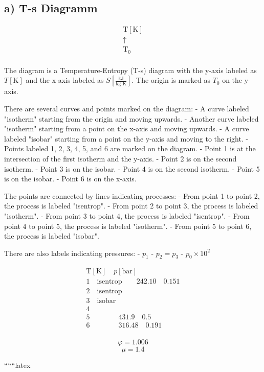 \subsection*{a) T-s Diagramm}

\[
\begin{array}{c}
\text{T} [\text{K}] \\
\uparrow \\
\text{T}_0 \\
\end{array}
\]

\noindent
The diagram is a Temperature-Entropy (T-s) diagram with the y-axis labeled as \( T [\text{K}] \) and the x-axis labeled as \( S [\frac{\text{kJ}}{\text{kg K}}] \). The origin is marked as \( T_0 \) on the y-axis. 

There are several curves and points marked on the diagram:
- A curve labeled "isotherm" starting from the origin and moving upwards.
- Another curve labeled "isotherm" starting from a point on the x-axis and moving upwards.
- A curve labeled "isobar" starting from a point on the y-axis and moving to the right.
- Points labeled 1, 2, 3, 4, 5, and 6 are marked on the diagram.
- Point 1 is at the intersection of the first isotherm and the y-axis.
- Point 2 is on the second isotherm.
- Point 3 is on the isobar.
- Point 4 is on the second isotherm.
- Point 5 is on the isobar.
- Point 6 is on the x-axis.

The points are connected by lines indicating processes:
- From point 1 to point 2, the process is labeled "isentrop".
- From point 2 to point 3, the process is labeled "isotherm".
- From point 3 to point 4, the process is labeled "isentrop".
- From point 4 to point 5, the process is labeled "isotherm".
- From point 5 to point 6, the process is labeled "isobar".

There are also labels indicating pressures:
- \( p_1 \)
- \( p_2 = p_3 \)
- \( p_0 \times 10^2 \)

\[
\begin{array}{c}
\text{T} [\text{K}] \quad p [\text{bar}] \\
1 \quad \text{isentrop} \quad \quad 242.10 \quad 0.151 \\
2 \quad \text{isentrop} \quad \quad \\
3 \quad \text{isobar} \quad \quad \\
4 \quad \quad \quad \quad \\
5 \quad \quad \quad \quad 431.9 \quad 0.5 \\
6 \quad \quad \quad \quad 316.48 \quad 0.191 \\
\end{array}
\]

\[
\varphi = 1.006
\]
\[
\mu = 1.4
\]

``````latex
